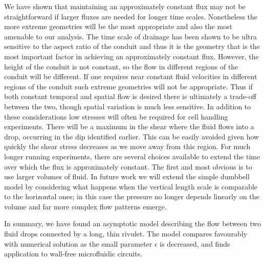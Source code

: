 \documentclass{jfm}
\begin{document}
 We have shown that maintaining an approximately constant    flux may not be straightforward if larger fluxes are needed for longer time scales.
Nonetheless  the more extreme geometries will be the most appropriate and also the most amenable to our analysis.
The time scale of drainage has been shown to be ultra sensitive to the aspect ratio of the conduit  and  thus it is the geometry that is the most important factor in achieving an approximately constant   flux.
However,  the  height of the  conduit  is not constant, so the flow in different regions of the  conduit  will be different.
If one requires near constant fluid velocities in different regions of the  conduit  such extreme geometries will not be appropriate.
Thus if both constant temporal and spatial flow is desired there is ultimately a trade-off  between the two, though spatial variation is much less sensitive.
In addition to these considerations low stresses will often be required for cell handling experiments.
There will be a maximum in the shear where the fluid flows into a drop,  occurring in the dip identified earlier.
This can be easily avoided given how quickly the shear stress decreases as we move away from this region. 
For much longer running experiments, there are several choices available to extend the  time over which the flux is approximately constant.
The first and most obvious is to use larger volumes of fluid.
In future  work 
we  will  extend the simple dumbbell model by considering what happens when the vertical length scale is comparable to the horizontal ones; in this case  the pressure no longer depends linearly on the volume and far more complex flow patterns emerge. 


In summary, we have  found  an asymptotic model describing the flow   between two fluid drops connected by a long, thin rivulet.
The model compares favourably with  numerical solution as the small parameter $\epsilon$ is decreased, and finds application to wall-free microfluidic circuits.
\end{document}
